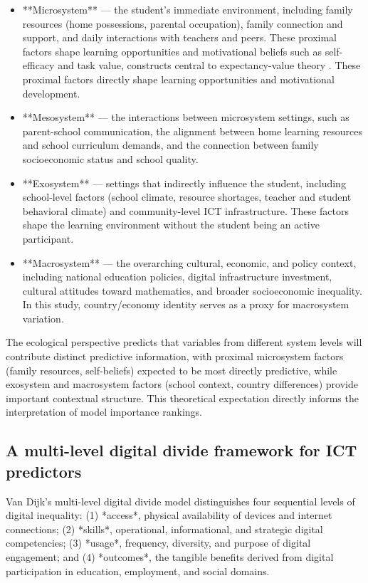 \documentclass[pdflatex,sn-mathphys-ay]{sn-jnl}
\begin{document}
\begin{itemize}
\item **Microsystem** — the student's immediate environment, including family resources (home possessions, parental occupation), family connection and support, and daily interactions with teachers and peers. These proximal factors shape learning opportunities and motivational beliefs such as self-efficacy and task value, constructs central to expectancy-value theory \citep{Eccles_Wigfield_2002}. These proximal factors directly shape learning opportunities and motivational development.
\item **Mesosystem** — the interactions between microsystem settings, such as parent-school communication, the alignment between home learning resources and school curriculum demands, and the connection between family socioeconomic status and school quality.
\item **Exosystem** — settings that indirectly influence the student, including school-level factors (school climate, resource shortages, teacher and student behavioral climate) and community-level ICT infrastructure. These factors shape the learning environment without the student being an active participant.
\item **Macrosystem** — the overarching cultural, economic, and policy context, including national education policies, digital infrastructure investment, cultural attitudes toward mathematics, and broader socioeconomic inequality. In this study, country/economy identity serves as a proxy for macrosystem variation.
\end{itemize}

The ecological perspective predicts that variables from different system levels will contribute distinct predictive information, with proximal microsystem factors (family resources, self-beliefs) expected to be most directly predictive, while exosystem and macrosystem factors (school context, country differences) provide important contextual structure. This theoretical expectation directly informs the interpretation of model importance rankings.

\subsection{A multi-level digital divide framework for ICT predictors}

Van Dijk's multi-level digital divide model distinguishes four sequential levels of digital inequality: (1) *access*, physical availability of devices and internet connections; (2) *skills*, operational, informational, and strategic digital competencies; (3) *usage*, frequency, diversity, and purpose of digital engagement; and (4) *outcomes*, the tangible benefits derived from digital participation in education, employment, and social domains.
\end{document}
